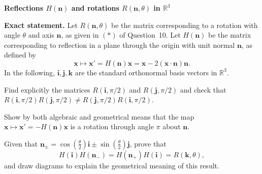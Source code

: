 \begin{problem}[CP-I-0082]
\label{prob:cp-i-0082}
\textbf{Reflections $H(\mathbf n)$ and rotations $R(\mathbf n,\theta)$ in $\mathbb R^3$}

\textbf{Exact statement.}
\hspace*{1.5em}Let $R(\mathbf n,\theta)$ be the matrix corresponding to a rotation with angle $\theta$ and axis $\mathbf n$, as given in $(*)$ of Question~10.
Let $H(\mathbf n)$ be the matrix corresponding to reflection in a plane through the origin with unit normal $\mathbf n$, as defined by
\[
\mathbf x\mapsto \mathbf x'=H(\mathbf n)\mathbf x=\mathbf x-2(\mathbf x\cdot\mathbf n)\mathbf n.
\]
In the following, $\mathbf i,\mathbf j,\mathbf k$ are the standard orthonormal basis vectors in $\mathbb R^3$.

	\par\noindent\textbullet\quad Find explicitly the matrices $R(\mathbf i,\pi/2)$ and $R(\mathbf j,\pi/2)$ and check that
	$R(\mathbf i,\pi/2)R(\mathbf j,\pi/2)\neq R(\mathbf j,\pi/2)R(\mathbf i,\pi/2)$.
	\par\noindent\textbullet\quad Show by both algebraic and geometrical means that the map $\mathbf x\mapsto \mathbf x'=-H(\mathbf n)\mathbf x$ is a rotation through angle $\pi$ about $\mathbf n$.
	\par\noindent\textbullet\quad Given that $\mathbf n_\pm=\cos(\tfrac{\theta}{2})\mathbf i \pm \sin(\tfrac{\theta}{2})\mathbf j$, prove that
	\[
	H(\mathbf i)H(\mathbf n_-)=H(\mathbf n_+)H(\mathbf i)=R(\mathbf k,\theta),
	\]
	and draw diagrams to explain the geometrical meaning of this result.
\end{problem}

